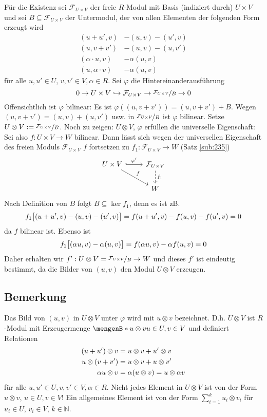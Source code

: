 Für die Existenz sei $\mathcal{F}_{U \times V}$ der freie $R$-Modul mit Basis (indiziert durch) $U \times V$ und sei $B \subseteq \mathcal{F}_{U \times V}$ der Untermodul,
der von allen Elementen der folgenden Form erzeugt wird
\begin{align*}
	(u+u', v) &- (u,v) - (u', v) \\
	(u,v+v') &- (u,v) - (u,v') \\
	(\alpha \cdot u, v) &- \alpha(u,v) \\
	(u, \alpha \cdot v) &- \alpha(u,v)
\end{align*}
für alle $u,u' \in U$, $v,v' \in V, \alpha \in R$. Sei $\varphi$ die Hintereinanderausführung
\[
	0 \to U \times V \hookrightarrow \mathcal{F}_{U \times V} \to \nicefrac{\mathcal{F}_{U \times V}}{B} \to 0
\]
Offensichtlich ist $\varphi$ bilinear: Es ist $\varphi((u,v+ v')) = (u, v+ v')+ B $. Wegen $(u, v+v')= (u,v)+ (u, v')$ usw. in $\nicefrac{\mathcal{F}_{U\times V}}{B}$ ist
$\varphi$ bilinear. Setze $U \otimes V := \nicefrac{\mathcal{F}_{U \times V}}{B}$. Noch zu zeigen: $U \otimes V$, $\varphi$ erfüllen die universelle Eigenschaft:
Sei also $f : U \times V \to W$ bilinear. Dann lässt sich wegen der universellen Eigenschaft des freien Moduls $\mathcal{F}_{U \times V}$ $f$ fortsetzen zu 
$f_1 : \mathcal{F}_{U \times V} \to W$ (Satz \ref{sub:235})
\[
	\begin{tikzcd}
		U \times V \rar[hook]{\varphi'} \drar{f}& \mathcal{F}_{U \times V} \dar[dashed]{f_1}\\
		& W
	\end{tikzcd}
\]
Nach Definition von $B$ folgt $B \subseteq \ker f_1$, denn es ist zB.
\[
	f_1 \benbrace[\big]{(u+ u', v) - (u,v)- (u',v)} = f(u+u',v) - f(u,v) - f(u',v) = 0 
\]
da $f$ bilinear ist. Ebenso ist
\[
	f_1 \benbrace[\big]{(\alpha u, v) - \alpha(u,v)} = f(\alpha u,v) - \alpha f(u,v)  = 0 
\]
Daher erhalten wir $f' : U \otimes V = \nicefrac{\mathcal{F}_{U \times V}}{B} \to W$ und dieses $f'$ ist eindeutig bestimmt, da die Bilder von $(u,v)$ den Modul 
$U \otimes V$ erzeugen. \bewende

\subsection[Bemerkung: Elemente des Tensorprodukts, Modulstruktur des Tensorprodukts]{Bemerkung} %
\label{sub:32}
Das Bild von $(u,v)$ in $U \otimes V$ unter $\varphi$ wird mit $u \otimes v$ bezeichnet. D.h. $U \otimes V$ ist $R$-Modul mit Erzeugermenge 
$\set[u \otimes v]{u \in U, v \in V} $ und definiert Relationen
\begin{align*}
	(u+ u') \otimes v &= u \otimes v + u' \otimes v \\
	u \otimes (v+v') &= u \otimes v + u \otimes v' \\
	\alpha u \otimes v &=  \alpha \enbrace*{u \otimes v} = u \otimes \alpha v 
\end{align*}
für alle $u,u' \in U, v,v' \in V, \alpha \in R$. 
Nicht jedes Element in $U \otimes V$ ist von der Form $u \otimes v$, $u \in U, v \in V$! Ein allgemeines Element ist von der Form $\sum_{i=1}^{k} u_i \otimes v_i $ für
$u_i \in U$, $v_i \in V$, $k \in \mathds{N}$.

